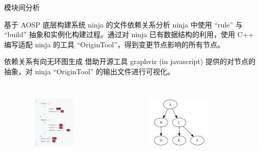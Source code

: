     \begin{frame}{模块间分析}
        \begin{block}{基于 AOSP 底层构建系统 ninja 的文件依赖关系分析}
            \small ninja 中使用 “rule” 与 “build” 抽象和实例化构建过程。通过对 ninja 已有数据结构的利用，使用 C++ 编写适配 ninja 的工具 “OriginTool”，得到变更节点影响的所有节点。\cite{ninja-hacked}
        \end{block}
        \begin{block}{依赖关系有向无环图生成}
            \small 借助开源工具 graphviz (in javascript) 提供的对节点的抽象，对 ninja “OriginTool” 的输出文件进行可视化。\cite{deps-reflector}
        \end{block}

        \begin{columns}
            \begin{figure}
                \centering \includegraphics[width=1.2in, height=1in]{contents/figure/ninja_hacked_output.png}
                \label{fig:ninja-hacked-output}
            \end{figure}
            \begin{figure}
                \centering \includegraphics[width=1.8in, height=1in]{contents/figure/ninja_logic.png}
                \label{fig:ninja-logic}
            \end{figure}
        \end{columns}
    \end{frame}

